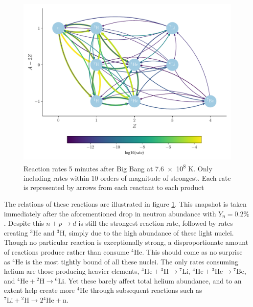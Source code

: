 \begin{figure}[ht]
    \includegraphics[width=5.1in]{figures/smallnet5minutes.pdf}
    \caption{Reaction rates 5 minutes after Big Bang at \num{7.6e8} K. Only including rates within 10 orders of magnitude of strongest. Each rate is represented by arrows from each reactant to each product}
    \label{fig:5minutenet}
\end{figure}

The relations of these reactions are illustrated in figure \ref{fig:5minutenet}. This snapshot is taken immediately after the aforementioned drop in neutron abundance with $Y_n=0.2\%$. Despite this $n+p\rightarrow d$ is still the strongest reaction rate, followed by rates creating ${}^3$He and ${}^3$H, simply due to the high abundance of these light nuclei. Though no particular reaction is exceptionally strong, a disproportionate amount of reactions produce rather than consume ${}^4$He. This should come as no surprise as ${}^4$He is the most tightly bound of all these nuclei. The only rates consuming helium are those producing heavier elements, ${}^4\text{He}+{}^3\text{H}\rightarrow {}^7\text{Li}$, ${}^4\text{He}+{}^3\text{He}\rightarrow {}^7\text{Be}$, and ${}^4\text{He}+{}^2\text{H}\rightarrow {}^6\text{Li}$. Yet these barely affect total helium abundance, and to an extent help create more ${}^4$He through subsequent reactions such as ${}^7\text{Li}+{}^2\text{H}\rightarrow 2 {}^4\text{He}+\text{n}$. 


